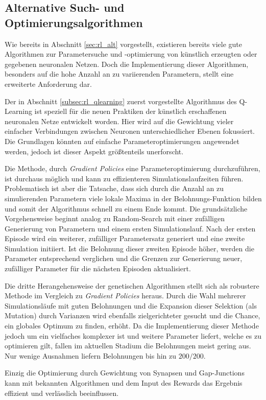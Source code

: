 	\subsection{Alternative Such- und Optimierungsalgorithmen}
		Wie bereits in Abschnitt \ref{sec:rl_alt} vorgestellt, existieren bereits viele gute Algorithmen zur Parametersuche und -optimierung von künstlich erzeugten oder gegebenen neuronalen Netzen. Doch die Implementierung dieser Algorithmen, besonders auf die hohe Anzahl an zu variierenden Parametern, stellt eine erweiterte Anforderung dar.
		
		Der in Abschnitt \ref{subsec:rl_qlearning} zuerst vorgestellte Algorithmus des Q-Learning ist speziell für die neuen Praktiken der künstlich erschaffenen neuronalen Netze entwickelt worden. Hier wird auf die Gewichtung vieler einfacher Verbindungen zwischen Neuronen unterschiedlicher Ebenen fokussiert. Die Grundlagen könnten auf einfache Parameteroptimierungen angewendet werden, jedoch ist dieser Aspekt größtenteils unerforscht.
		
		Die Methode, durch \textit{Gradient Policies} eine Parameteroptimierung durchzuführen, ist durchaus möglich und kann zu effizienteren Simulationslaufzeiten führen. Problematisch ist aber die Tatsache, dass sich durch die Anzahl an zu simulierenden Parametern viele lokale Maxima in der Belohnungs-Funktion bilden und somit der Algorithmus schnell zu einem Ende kommt. Die grundsätzliche Vorgehensweise beginnt analog zu Random-Search mit einer zufälligen Generierung von Parametern und einem ersten Simulationslauf. Nach der ersten Episode wird ein weiterer, zufälliger Parametersatz generiert und eine zweite Simulation initiiert. Ist die Belohnung dieser zweiten Episode höher, werden die Parameter entsprechend verglichen und die Grenzen zur Generierung neuer, zufälliger Parameter für die nächsten Episoden aktualisiert.
		
		Die dritte Herangehensweise der genetischen Algorithmen stellt sich als robustere Methode im Vergleich zu \textit{Gradient Policies} heraus. Durch die Wahl mehrerer Simulationsläufe mit guten Belohnungen und die Expansion dieser Selektion (als Mutation) durch Varianzen wird ebenfalls zielgerichteter gesucht und die Chance, ein globales Optimum zu finden, erhöht. Da die Implementierung dieser Methode jedoch um ein vielfaches komplexer ist und weitere Parameter liefert, welche es zu optimieren gilt, fallen im aktuellen Stadium die Belohnungen meist gering aus. Nur wenige Ausnahmen liefern Belohnungen bis hin zu $200/200$.
		
		Einzig die Optimierung durch Gewichtung von Synapsen und Gap-Junctions kann mit bekannten Algorithmen und dem Input des Rewards das Ergebnis effizient und verlässlich beeinflussen.


